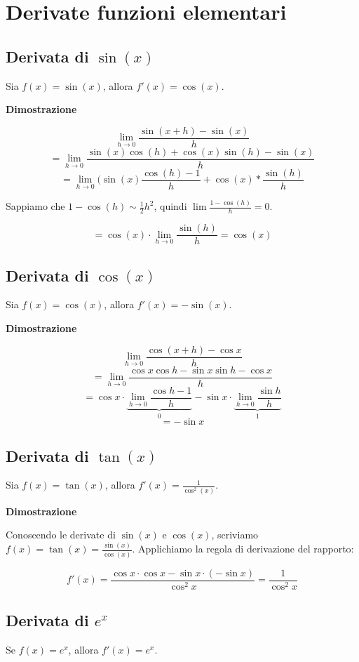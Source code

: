 \section{Derivate funzioni elementari}

\subsection{Derivata di $\sin(x)$}
Sia $f(x) = \sin(x)$, allora $f'(x) = \cos(x)$.

\textbf{Dimostrazione}

$$\lim_{h\to 0} \frac{\sin(x+h)-\sin(x)}{h} $$ $$
=\lim_{h\to 0} \frac{\sin(x)\cos(h)+\cos(x)\sin(h)-\sin(x)}{h} $$ $$
=\lim_{h\to 0} (\sin(x)\frac{\cos(h)-1}{h} + \cos(x)*\frac{\sin(h)}{h}$$

Sappiamo che $1 - \cos(h) \sim \frac{1}{2} h^2$, quindi $\lim \frac{1-\cos(h)}{h} = 0$.

$$= \cos(x) \cdot \lim_{h \to 0} \frac{\sin(h)}{h} = \cos(x)$$

\subsection{Derivata di $\cos(x)$}
Sia $f(x) = \cos(x)$, allora $f'(x) = -\sin(x)$.

\textbf{Dimostrazione}

$$\lim_{h \to 0} \frac{\cos (x+h) - \cos x}{h} $$ $$
=  \lim_{h \to 0} \frac{\cos x \cos h - \sin x \sin h - \cos x}{h} $$ $$
=  \cos x \cdot \underbrace{\lim_{h \to 0} \frac{\cos h - 1}{h}}_{0} - \sin x \cdot \underbrace{\lim_{h \to 0} \frac{\sin h}{h}}_{1} $$ $$
=  - \sin x$$

\subsection{Derivata di $\tan(x)$}

Sia $f(x) = \tan(x)$, allora $f'(x) = \frac{1}{\cos^2(x)}$.

\textbf{Dimostrazione}

Conoscendo le derivate di $\sin(x)$ e $\cos(x)$, scriviamo $f(x) = \tan(x) = \frac{\sin(x)}{\cos(x)}$. Applichiamo la regola di derivazione del rapporto:

$$f'(x) = \frac{\cos x \cdot \cos x - \sin x \cdot (-\sin x)}{\cos^2 x} = \frac{1}{\cos^2x}$$

\subsection{Derivata di $e^x$}
Se $f(x) = e^x$, allora $f'(x) = e^x$.

